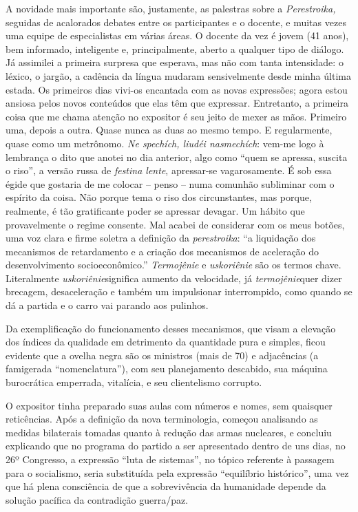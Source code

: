 A novidade mais importante são, justamente, as palestras sobre a
\emph{Perestroika,} seguidas de acalorados debates entre os
participantes e o docente, e muitas vezes uma equipe de especialistas em
várias áreas. O docente da vez é jovem (41 anos), bem informado,
inteligente e, principalmente, aberto a qualquer tipo de diálogo. Já
assimilei a primeira surpresa que esperava, mas não com tanta
intensidade: o léxico, o jargão, a cadência da língua mudaram
sensivelmente desde minha última estada. Os primeiros dias vivi-os
encantada com as novas expressões; agora estou ansiosa pelos novos
conteúdos que elas têm que expressar. Entretanto, a primeira coisa que
me chama atenção no expositor é seu jeito de mexer as mãos. Primeiro
uma, depois a outra. Quase nunca as duas ao mesmo tempo. E regularmente,
quase como um metrônomo. \emph{Ne spechích, liudéi nasmechích}: vem-me
logo à lembrança o dito que anotei no dia anterior, algo como ``quem se
apressa, suscita o riso'', a versão russa de \emph{festina lente},
apressar-se vagarosamente. É sob essa égide que gostaria de me colocar
-- penso -- numa comunhão subliminar com o espírito da coisa. Não porque
tema o riso dos circunstantes, mas porque, realmente, é tão gratificante
poder se apressar devagar. Um hábito que provavelmente o regime
consente. Mal acabei de considerar com os meus botões, uma voz clara e
firme soletra a definição da \emph{perestroika}: ``a liquidação dos
mecanismos de retardamento e a criação dos mecanismos de aceleração do
desenvolvimento socioeconômico.'' \emph{Termojênie} e \emph{uskoriênie}
são os termos chave. Literalmente \emph{uskoriênie}significa aumento da
velocidade, já \emph{termojênie}quer dizer brecagem, desaceleração e
também um impulsionar interrompido, como quando se dá a partida e o
carro vai parando aos pulinhos.

Da exemplificação do funcionamento desses mecanismos, que visam a
elevação dos índices da qualidade em detrimento da quantidade pura e
simples, ficou evidente que a ovelha negra são os ministros (mais de 70)
e adjacências (a famigerada ``nomenclatura''), com seu planejamento
descabido, sua máquina burocrática emperrada, vitalícia, e seu
clientelismo corrupto.

O expositor tinha preparado suas aulas com números e nomes, sem
quaisquer reticências. Após a definição da nova terminologia, começou
analisando as medidas bilaterais tomadas quanto à redução das armas
nucleares, e concluiu explicando que no programa do partido a ser
apresentado dentro de uns dias, no 26º Congresso, a expressão ``luta de
sistemas'', no tópico referente à passagem para o socialismo, seria
substituída pela expressão ``equilíbrio histórico'', uma vez que há
plena consciência de que a sobrevivência da humanidade depende da
solução pacífica da contradição guerra/paz.

